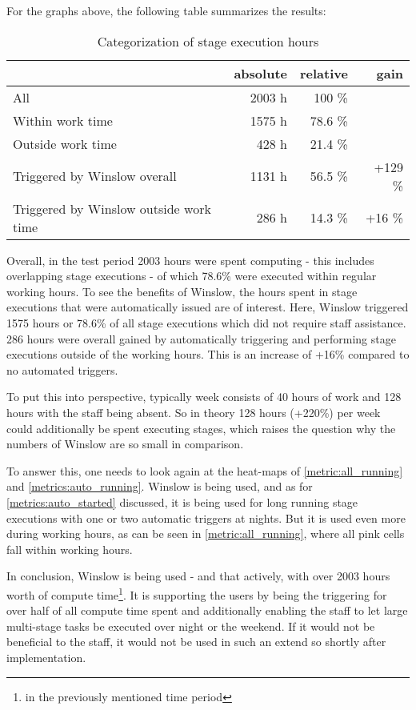 For the graphs above, the following table summarizes the results:

\begin{table}[H]
	\centering
	\begin{tabular}{|l|r|r|r|}\hline
												& absolute 			& relative	& gain \\
		\hline
		All 		 							& 2003 h 			& 100 \% 	& \\
		Within work time						& 1575 h			& 78.6 \% 	& \\
		Outside work time	 					&  428 h			& 21.4 \% 	& \\
		Triggered by Winslow overall			& 1131 h			& 56.5 \%	& +129 \%\\
		Triggered by Winslow outside work time	&  286 h 			& 14.3 \% 	& +16 \%\\
\hline
	\end{tabular}
	\caption{Categorization of stage execution hours}
\end{table}

Overall, in the test period 2003 hours were spent computing - this includes overlapping stage executions - of which 78.6\% were executed within regular working hours.
To see the benefits of Winslow, the hours spent in stage executions that were automatically issued are of interest.
Here, Winslow triggered 1575 hours or 78.6\% of all stage executions which did not require staff assistance.
286 hours were overall gained by automatically triggering and performing stage executions outside of the working hours.
This is an increase of +16\% compared to no automated triggers.

To put this into perspective, typically week consists of 40 hours of work and 128 hours with the staff being absent.
So in theory 128 hours (+220\%) per week could additionally be spent executing stages, which raises the question why the numbers of Winslow are so small in comparison.

To answer this, one needs to look again at the heat-maps of \autoref{metric:all_running} and \autoref{metrics:auto_running}.
Winslow is being used, and as for \autoref{metrics:auto_started} discussed, it is being used for long running stage executions with one or two automatic triggers at nights.
But it is used even more during working hours, as can be seen in \autoref{metric:all_running}, where all pink cells fall within working hours.

In conclusion, Winslow is being used - and that actively, with over 2003 hours worth of compute time\footnote{in the previously mentioned time period}.
It is supporting the users by being the triggering for over half of all compute time spent and additionally enabling the staff to let large multi-stage tasks be executed over night or the weekend.
If it would not be beneficial to the staff, it would not be used in such an extend so shortly after implementation.

